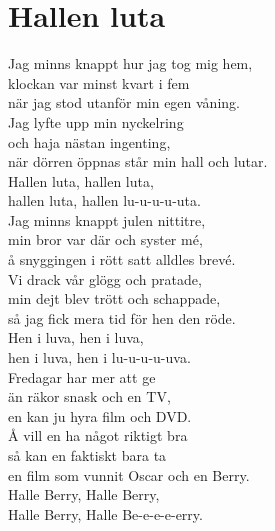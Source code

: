\section{Hallen luta}
Jag minns knappt hur jag tog mig hem,\\
klockan var minst kvart i fem\\
när jag stod utanför min egen våning.\\
Jag lyfte upp min nyckelring\\
och haja nästan ingenting,\\
när dörren öppnas står min hall och lutar.\\
Hallen luta, hallen luta,\\
hallen luta, hallen lu-u-u-u-uta.\\

Jag minns knappt julen nittitre,\\
min bror var där och syster mé,\\
å snyggingen i rött satt alldles brevé.\\
Vi drack vår glögg och pratade,\\
min dejt blev trött och schappade,\\
så jag fick mera tid för hen den röde.\\
Hen i luva, hen i luva,\\
hen i luva, hen i lu-u-u-u-uva.\\

Fredagar har mer att ge\\
än räkor snask och en TV,\\
en kan ju hyra film och DVD.\\
Å vill en ha något riktigt bra\\
så kan en faktiskt bara ta\\
en film som vunnit Oscar och en Berry.\\
Halle Berry, Halle Berry,\\
Halle Berry, Halle Be-e-e-e-erry.\\
